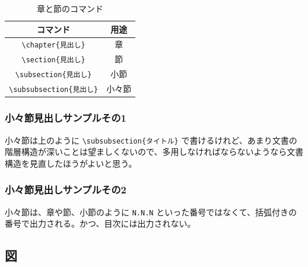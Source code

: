 \begin{table}[htbp]
  \caption{章と節のコマンド}
  \label{tb:chap}
  \begin{center}\begin{tabular}{c|c}
    \hline
    コマンド&用途\\\hline\hline
    \verb|\chapter{見出し}|&章\\\hline
    \verb|\section{見出し}|&節\\\hline
    \verb|\subsection{見出し}|&小節\\\hline
    \verb|\subsubsection{見出し}|&小々節\\\hline
    \end{tabular}\end{center}
\end{table}

\subsubsection{小々節見出しサンプルその1}

小々節は上のように \verb|\subsubsection{タイトル}| で書けるけれど、あまり文書の階層構造が深いことは望ましくないので、多用しなければならないようなら文書構造を見直したほうがよいと思う。

\subsubsection{小々節見出しサンプルその2}

小々節は、章や節、小節のように {\tt N.N.N} といった番号ではなくて、括弧付きの番号で出力される。かつ、目次には出力されない。

\subsection{図}

